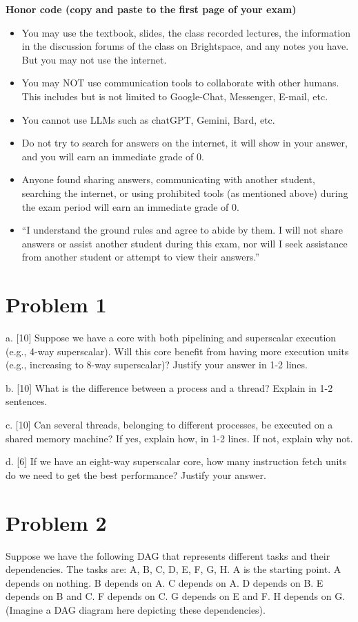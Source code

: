 \documentclass{article}
\begin{document}
\textbf{Honor code (copy and paste to the first page of your exam)}
\begin{itemize}
    \item You may use the textbook, slides, the class recorded lectures, the information in the discussion forums of the class on Brightspace, and any notes you have. But you may not use the internet.
    \item You may NOT use communication tools to collaborate with other humans. This includes but is not limited to Google-Chat, Messenger, E-mail, etc.
    \item You cannot use LLMs such as chatGPT, Gemini, Bard, etc.
    \item Do not try to search for answers on the internet, it will show in your answer, and you will earn an immediate grade of 0.
    \item Anyone found sharing answers, communicating with another student, searching the internet, or using prohibited tools (as mentioned above) during the exam period will earn an immediate grade of 0.
    \item “I understand the ground rules and agree to abide by them. I will not share answers or assist another student during this exam, nor will I seek assistance from another student or attempt to view their answers.”
\end{itemize}

\section*{Problem 1}
a. [10]  Suppose we have a core with both pipelining and superscalar execution (e.g.,  4-way superscalar). Will this core benefit from having more execution units (e.g., increasing to 8-way superscalar)? Justify your answer in 1-2 lines.

b. [10]  What is the difference between a process and a thread? Explain in 1-2 sentences.

c. [10]  Can several threads, belonging to different processes, be executed on a shared memory machine? If yes, explain how, in 1-2 lines. If not, explain why not.

d. [6] If we have an eight-way superscalar core, how many instruction fetch units do we need to get the best performance? Justify your answer.


\section*{Problem 2}
Suppose we have the following DAG that represents different tasks and their dependencies.  The tasks are: A, B, C, D, E, F, G, H.  A is the starting point. A depends on nothing. B depends on A. C depends on A. D depends on B. E depends on B and C. F depends on C. G depends on E and F. H depends on G. (Imagine a DAG diagram here depicting these dependencies).
\end{document}
